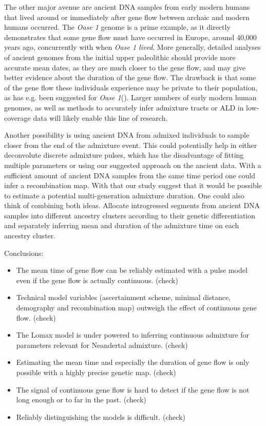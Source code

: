 The other major avenue are ancient DNA samples from early modern humans that lived around or immediately after gene flow between archaic and modern humans occurred. The \textit{Oase 1} genome is a prime example, as it directly demonstrates that some gene flow must have occurred in Europe, around 40,000 years ago, concurrently with when \textit{Oase 1 lived}. More generally, detailed analyses of ancient genomes from the initial upper paleolithic should provide more accurate mean dates, as they are much closer to the gene flow, and may give better evidence about the duration of the gene flow. The drawback is that some of the gene flow these individuals experience may be private to their population, as has e.g. been suggested for \textit{Oase 1}(\cite{fu_genome_2014}). Larger numbers of early modern human genomes, as well as methods to accurately infer admixture tracts or ALD in low-coverage data will likely enable this line of research. 

 Another possibility is using ancient DNA from admixed individuals to sample closer from the end of the admixture event. This could potentially help in either deconvolute discrete admixture pulses, which has the disadvantage of fitting multiple parameters or using our suggested approach on the ancient data. With a sufficient amount of ancient DNA samples from the same time period one could infer a recombination map. With that our study suggest that it would be possible to estimate a potential multi-generation admixture duration. One could also think of combining both ideas. Allocate introgressed segments from ancient DNA samples into different ancestry clusters according to their genetic differentiation and separately inferring mean and duration of the admixture time on each ancestry cluster. 

Conclusions:

\begin{itemize}
    \item The mean time of gene flow can be reliably estimated with a pulse model even if the gene flow is actually continuous. (check)
  \item Technical model variables (ascertainment scheme, minimal distance, demography and recombination map) outweigh the effect of continuous gene flow. (check)
  \item The Lomax model is under powered to inferring continuous admixture for parameters relevant for Neandertal admixture. (check)
  \item Estimating  the mean time and especially the duration of gene flow is only possible with a highly precise genetic map. (check)
  \item The signal of continuous gene flow is hard to detect if the gene flow is not long enough or to far in the past. (check)
  \item Reliably distinguishing the models is difficult. (check)
\end{itemize}

